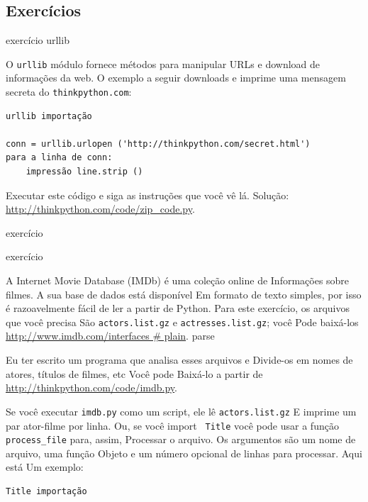 \documentclass[10pt]{book}
\begin{document}
\begin{v erbatim}


\section{Exercícios}

\begin{} exercício
\label{} urllib

O {\tt urllib} módulo fornece métodos para manipular URLs
e download de informações da web. O exemplo a seguir
downloads e imprime uma mensagem secreta do {\tt thinkpython.com}:

\begin{verbatim}
urllib importação

conn = urllib.urlopen ('http://thinkpython.com/secret.html')
para a linha de conn:
    impressão line.strip ()
\end{verbatim}

Executar este código e siga as instruções que você vê lá.
Solução: \url{http://thinkpython.com/code/zip_code.py}.

\end{} exercício


\begin{} exercício

A Internet Movie Database (IMDb) é uma coleção online de
Informações sobre filmes. A sua base de dados está disponível
Em formato de texto simples, por isso é razoavelmente fácil de ler a partir de
Python. Para este exercício, os arquivos que você precisa
São {\tt actors.list.gz} e {\tt actresses.list.gz}; você
Pode baixá-los \url{http://www.imdb.com/interfaces # plain}.
\index{} parse

Eu ter escrito um programa que analisa esses arquivos e
Divide-os em nomes de atores, títulos de filmes, etc Você pode
Baixá-lo a partir de \url{http://thinkpython.com/code/imdb.py}.

Se você executar {\tt imdb.py} como um script, ele lê {\tt actors.list.gz}
E imprime um par ator-filme por linha. Ou, se você {import \tt
Title} você pode usar a função \verb "process_file" para, assim,
Processar o arquivo. Os argumentos são um nome de arquivo, uma função
Objeto e um número opcional de linhas para processar. Aqui está
Um exemplo:
%
\begin{verbatim}
Title importação


\end{verbatim}
\end{}
\end{v erbatim}
\end{document}
